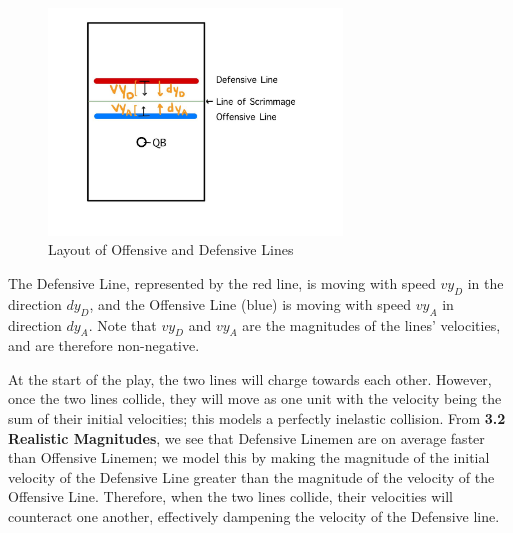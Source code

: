 \begin{figure}[htp]
    \includegraphics[width=7.8cm]{figure/3_line_velocities.jpg}
    \caption{Layout of Offensive and Defensive Lines}
\end{figure}

The Defensive Line, represented by the red line, is moving with speed $vy_D$ in the direction $dy_D$, and the Offensive Line (blue) is moving with speed $vy_A$ in direction $dy_A$. Note that $vy_D$ and $vy_A$ are the magnitudes of the lines' velocities, and are therefore non-negative. 

\newpage
 
At the start of the play, the two lines will charge towards each other. However, once the two lines collide, they will move as one unit with the velocity being the sum of their initial velocities; this models a perfectly inelastic collision. From \textbf{3.2 Realistic Magnitudes}, we see that Defensive Linemen are on average faster than Offensive Linemen; we model this by making the magnitude of the initial velocity of the Defensive Line greater than the magnitude of the velocity of the Offensive Line. Therefore, when the two lines collide, their velocities will counteract one another, effectively dampening the velocity of the Defensive line. \\

